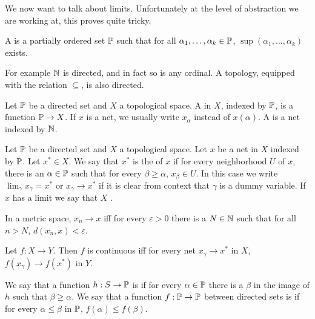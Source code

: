 \begin{subsec}
We now want to talk about limits. Unfortunately at the level of abstraction we are working at, this proves quite tricky.
\end{subsec}

\begin{definition}
A  is a partially ordered set $\mathbb{P}$ such that for all $\alpha_1, \dots, \alpha_{k} \in \mathbb{P}$, $\sup(\alpha_1, \dots, \alpha_{k})$ exists.
\end{definition}

\begin{subsec}
For example $\mathbb{N}$ is directed, and in fact so is any ordinal. A topology, equipped with the relation $\subseteq$, is also directed.
\end{subsec}

\begin{definition}
Let $\mathbb{P}$ be a directed set and $X$ a topological space.
A  in $X$, indexed by $\mathbb{P}$, is a function $\mathbb{P} \to X$. If $x$ is a net, we usually write $x_\alpha$ instead of $x(\alpha)$.
A  is a net indexed by $\mathbb{N}$.
\end{definition}

\begin{definition}
Let $\mathbb{P}$ be a directed set and $X$ a topological space. Let $x$ be a net in $X$ indexed by $\mathbb{P}$. Let $x^* \in X$.
We say that $x^*$ is the  of $x$ if for every neighborhood $U$ of $x$, there is an $\alpha \in \mathbb{P}$ such that for every $\beta \geq \alpha$, $x_{\beta} \in U$.
In this case we write $\lim_{\gamma} x_{\gamma} = x^*$ or $x_{\gamma} \to x^*$ if it is clear from context that $\gamma$ is a dummy variable.
If $x$ has a limit we say that $X$ .
\end{definition}

\begin{lemma}
In a metric space, $x_{n} \to x$ iff for every $\varepsilon > 0$ there is a $N \in \mathbb{N}$ such that for all $n > N$, $d(x_{n}, x) < \varepsilon$.
\end{lemma}

\begin{lemma}
Let $f: X \to Y$. Then $f$ is continuous iff for every net $x_{\gamma} \to x^*$ in $X$, $f(x_\gamma) \to f(x^*)$ in $Y$.
\end{lemma}

\begin{definition}
We say that a function $h: S \to \mathbb{P}$ is  if for every $\alpha \in \mathbb{P}$ there is a $\beta$ in the image of $h$ such that $\beta \geq \alpha$.
We say that a function $f: \mathbb{P} \to \mathbb{P}$ between directed sets is  if for every $\alpha \leq \beta$ in $\mathbb{P}$, $f(\alpha) \leq f(\beta)$.
\end{definition}

